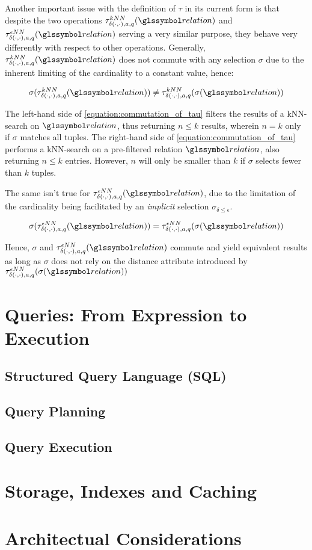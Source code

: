 Another important issue with the definition of $\tau$ in its current form is that despite the two operations $\tau^{kNN}_{\delta(\cdot,\cdot),a,q}(\relation)$ and $\tau^{\epsilon NN}_{\delta(\cdot,\cdot),a,q}(\relation)$ serving a very similar purpose, they behave very differently with respect to other operations. Generally, $\tau^{kNN}_{\delta(\cdot,\cdot),a,q}(\relation)$ does not commute with any selection $\sigma$ due to the inherent limiting of the cardinality to a constant value, hence:

\begin{equation}
    \label{equation:commutation_of_tau}
    \sigma(\tau^{kNN}_{\delta(\cdot,\cdot),a,q}(\relation)) \neq \tau^{kNN}_{\delta(\cdot,\cdot),a,q}(\sigma(\relation))
\end{equation}

The left-hand side of \cref{equation:commutation_of_tau} filters the results of a kNN-search on $\relation$, thus returning $n \leq k$ results, wherein $n = k$ only if $\sigma$ matches all tuples. The right-hand side of \cref{equation:commutation_of_tau} performs a kNN-search on a pre-filtered relation $\relation$, also returning $n \leq k$ entries. However, $n$ will only be smaller than $k$ if $\sigma$ selects fewer than $k$ tuples.

The same isn't true for $\tau^{\epsilon NN}_{\delta(\cdot,\cdot),a,q}(\relation)$, due to the limitation of the cardinality being facilitated by an \emph{implicit} selection $\sigma_{\delta \leq \epsilon}$.

\begin{equation}
    \sigma(\tau^{\epsilon NN}_{\delta(\cdot,\cdot),a,q}(\relation)) = \tau^{\epsilon NN}_{\delta(\cdot,\cdot),a,q}(\sigma(\relation))
\end{equation}

Hence, $\sigma$ and $\tau^{\epsilon NN}_{\delta(\cdot,\cdot),a,q}(\relation)$ commute and yield equivalent results as long as $\sigma$ does not rely on the distance attribute introduced by $\tau^{\epsilon NN}_{\delta(\cdot,\cdot),a,q}(\sigma(\relation))$

\section{Queries: From Expression to Execution}

\subsection{Structured Query Language (SQL)}

\subsection{Query Planning}

\subsection{Query Execution}

\section{Storage, Indexes and Caching}

\section{Architectual Considerations}